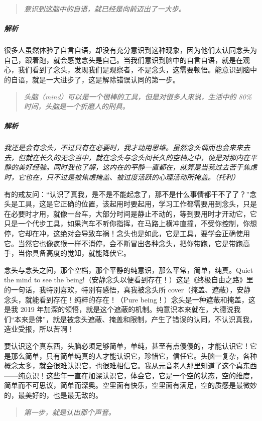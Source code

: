 \begin{quote}\it
    意识到这脑中的自语，就已经是向前迈出了一大步。
\end{quote}

\subparagraph{解析} 很多人虽然体验了自言自语，却没有充分意识到这种现象，因为他们太认同念头为自己，跟着跑，就会感觉念头是自己。当我们意识到脑中的自言自语，就是在观心，我们看到了念头，发现我们是观察者，不是念头，这需要顿悟。能意识到脑中的自语，就是一大进步了，这是解除错误认同的第一步。

\begin{quote}\it
    头脑（mind）可以是一个很棒的工具，但是对很多人来说，生活中的 80\% 时间，头脑是一个折磨人的刑具。
\end{quote}

\subparagraph{解析} \textit{我还是会有念头，不过只有在必要时，我才动用思维。虽然念头偶而也会来来去去，但就在长久的无念当中，就在念头与念头间长久的空档之中，便是对那内在平静的美好经验。同时我也了解，这内在的平静一直都在，就算是当我过去苦于焦虑时，它也在，只不过是被焦虑掩盖、被过度活跃的心理活动所掩盖。（托利）}

有的戒友问：“认识了真我，是不是不能起念了，那不是什么事情都干不了了？”念头是工具，这是它正确的位置，该起用时要起用，学习工作都需要用到念头，只是在必要时才用，就像一台车，大部分时间是静止不动的，等到要用时才开动它，它只是一个代步工具，如果汽车不听你指挥，在马路上横冲直撞，不受你控制，你想停，它却在冲，这绝对会导致车祸！念头也是如此，它是工具，要学会正确使用它。当然它也像疯猴一样不消停，会不断冒出各种念头，把你带跑，它是带跑高手，当你具备高度的觉知，就能降伏它。

念头与念头之间，那个空档，那个平静的纯意识，那么平常，简单，纯真。Quiet the mind to see the being!（安静念头以便看到存在！）这是《终极自由之路》里的一句话，我特别喜欢，特别有感悟，真我被念头所 cover（掩盖、遮蔽），安静念头，就能看到存在！纯粹的存在！（Pure being！）念头是一种遮蔽和掩盖，这是我 2019 年加深的领悟，就是这个遮蔽的机制。纯意识本来就在，大德说我们“本来是佛”，就是被念头遮蔽、掩盖和限制，产生了错误的认同，不认识真我，造业受报，所以苦啊！

要认识这个真东西，头脑必须足够简单，单纯，甚至有点傻傻的，才能认识它！它是那么简单，只有简单纯真的人才能认识它，珍惜它，信任它。头脑一复杂，各种概念太多，就会很难认识它，也很难相信它。我从元音老人那里知道了这个真东西——纯意识！这些年一直在加深认识它，体会它，它是一个空的状态，空的维度，简单而不可思议，简单而深奥。空里面有快乐，空里面有满足，空的质感是最微妙的，最美好的，也是最无敌的。

\begin{quote}\it
    第一步，就是认出那个声音。
\end{quote}

